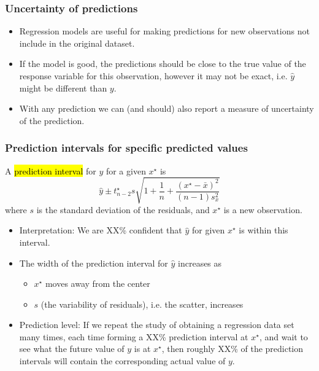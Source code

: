 \documentclass[slidestop,compress,mathserif,12pt,t,professionalfonts,xcolor=table]{beamer}
\begin{document}

\begin{frame}
\frametitle{Uncertainty of predictions}

\begin{itemize}

\item Regression models are useful for making predictions for new observations not include in the original dataset.

\pause

\item If the model is good, the predictions should be close to the true value of the response variable for this observation, 
however it may not be exact, i.e. $\hat{y}$ might be different than $y$.

\pause

\item With any prediction we can (and should) also report a measure of uncertainty of the prediction.

\end{itemize}

\end{frame}


\begin{frame}
\frametitle{Prediction intervals for specific predicted values}
{\small
A \hl{prediction interval} for $y$ for a given $x^\star$ is
\[ \hat{y} \pm t^\star_{n - 2} s \sqrt{ 1 + \frac{1}{n} + \frac{(x^\star - \bar{x})^2}{(n - 1)s_x^2} } \]
where $s$ is the standard deviation of the residuals, and $x^\star$ is a new observation.

\pause

\begin{itemize}

\item Interpretation: We are XX\% confident that $\hat{y}$ for given $x^\star$ is within this interval.

\pause

\item The width of the prediction interval for $\hat{y}$ increases as
\begin{itemize}
\item $x^\star$ moves away from the center
\item $s$ (the variability of residuals), i.e. the scatter, increases
\end{itemize}

\pause

\item Prediction level: If we repeat the study of obtaining a regression data set many times, each time forming a XX\% prediction 
interval at $x^\star$, and wait to see what the future value of $y$ is at $x^\star$, then roughly XX\% of the prediction intervals will 
contain the corresponding actual value of $y$.

\end{itemize}
}
\end{frame}
\end{document}
